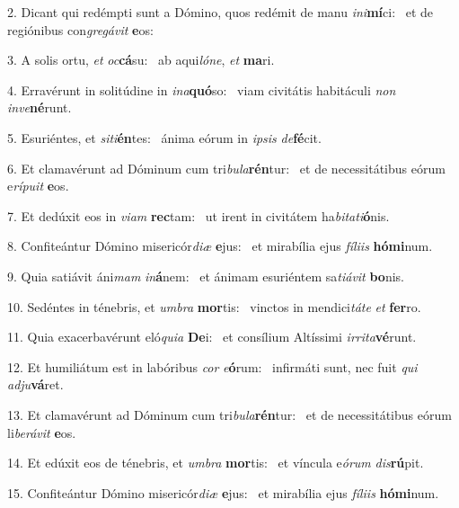 2. Dicant qui redémpti sunt a Dómino, quos redémit de manu \textit{in}\textit{i}\textbf{mí}ci: \ast\  et de regiónibus con\textit{gre}\textit{gá}\textit{vit} \textbf{e}os:\

3. A solis ortu, \textit{et} \textit{oc}\textbf{cá}su: \ast\  ab aqui\textit{ló}\textit{ne}, \textit{et} \textbf{ma}ri.\

4. Erravérunt in solitúdine in \textit{in}\textit{a}\textbf{quó}so: \ast\  viam civitátis habitáculi \textit{non} \textit{in}\textit{ve}\textbf{né}runt.\

5. Esuriéntes, et \textit{si}\textit{ti}\textbf{én}tes: \ast\  ánima eórum in \textit{ip}\textit{sis} \textit{de}\textbf{fé}cit.\

6. Et clamavérunt ad Dóminum cum tri\textit{bu}\textit{la}\textbf{rén}tur: \ast\  et de necessitátibus eórum e\textit{rí}\textit{pu}\textit{it} \textbf{e}os.\

7. Et dedúxit eos in \textit{vi}\textit{am} \textbf{rec}tam: \ast\  ut irent in civitátem ha\textit{bi}\textit{ta}\textit{ti}\textbf{ó}nis.\

8. Confiteántur Dómino misericór\textit{di}\textit{æ} \textbf{e}jus: \ast\  et mirabília ejus \textit{fí}\textit{li}\textit{is} \textbf{hó}\textbf{mi}num.\

9. Quia satiávit áni\textit{mam} \textit{in}\textbf{á}nem: \ast\  et ánimam esuriéntem sa\textit{ti}\textit{á}\textit{vit} \textbf{bo}nis.\

10. Sedéntes in ténebris, et \textit{um}\textit{bra} \textbf{mor}tis: \ast\  vinctos in mendici\textit{tá}\textit{te} \textit{et} \textbf{fer}ro.\

11. Quia exacerbavérunt eló\textit{qui}\textit{a} \textbf{De}i: \ast\  et consílium Altíssimi \textit{ir}\textit{ri}\textit{ta}\textbf{vé}runt.\

12. Et humiliátum est in labóribus \textit{cor} \textit{e}\textbf{ó}rum: \ast\  infirmáti sunt, nec fuit \textit{qui} \textit{ad}\textit{ju}\textbf{vá}ret.\

13. Et clamavérunt ad Dóminum cum tri\textit{bu}\textit{la}\textbf{rén}tur: \ast\  et de necessitátibus eórum li\textit{be}\textit{rá}\textit{vit} \textbf{e}os.\

14. Et edúxit eos de ténebris, et \textit{um}\textit{bra} \textbf{mor}tis: \ast\  et víncula e\textit{ó}\textit{rum} \textit{dis}\textbf{rú}pit.\

15. Confiteántur Dómino misericór\textit{di}\textit{æ} \textbf{e}jus: \ast\  et mirabília ejus \textit{fí}\textit{li}\textit{is} \textbf{hó}\textbf{mi}num.\

